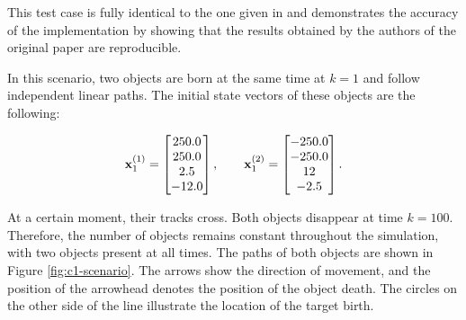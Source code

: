 This test case is fully identical to the one given in \cite{voGaussianMixtureProbability2006} and demonstrates the accuracy of the implementation by showing that the results obtained by the authors of the original paper are reproducible.

In this scenario, two objects are born at the same time at $k=1$ and follow independent linear paths. The initial state vectors of these objects are the following:

\begin{equation}
    \svecat{x}{1}{(1)} = \begin{bmatrix}
        250.0 \\
        250.0 \\
        2.5 \\
        -12.0
    \end{bmatrix},
    \qquad
    \svecat{x}{1}{(2)} = \begin{bmatrix}
        -250.0 \\
        -250.0 \\
        12 \\
        -2.5
    \end{bmatrix}.
\end{equation}

At a certain moment, their tracks cross. Both objects disappear at time $k=100$. Therefore, the number of objects remains constant throughout the simulation, with two objects present at all times. The paths of both objects are shown in Figure \ref{fig:c1-scenario}. The arrows show the direction of movement, and the position of the arrowhead denotes the position of the object death. The circles on the other side of the line illustrate the location of the target birth.

